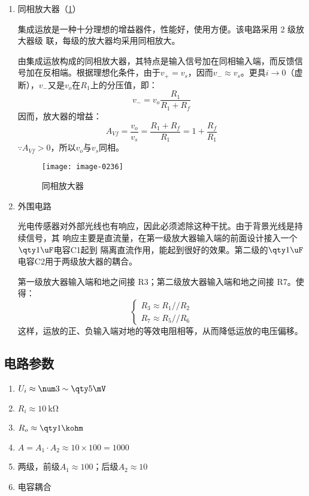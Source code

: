 \begin{enumerate}
  \item 同相放大器\cite{cn10}（\cref{4-3}）
  
  集成运放是一种十分理想的增益器件，性能好，使用方便。该电路采用 2 级放大器级
  联，每级的放大器均采用同相放大。

  由集成运放构成的同相放大器，其特点是输入信号加在同相输入端，而反馈信号加在反相端。根据理想化条件，由于$v_+=v_s$，因而$v_-\approx v_s$。更具$i\to0$（虚断），$v_-$又是$v_o$在$R_1$上的分压值，即：
  \begin{equation}
    v_-=v_o\frac{R_1}{R_1+R_f}
  \end{equation}
  因而，放大器的增益：
  \begin{equation}
    A_{Vf}=\frac{v_o}{v_s}=\frac{R_1+R_f}{R_1}=1+\frac{R_f}{R_1}
  \end{equation}
  $\because A_{Vf}>0$，所以$v_o$与$v_s$同相。
  
  \begin{figure}[htbp]
    \centering
    \texttt{[image: image-0236]}
    \caption{同相放大器}
    \label{4-3}
  \end{figure}
  \item 外围电路
  
  光电传感器对外部光线也有响应，因此必须滤除这种干扰。由于背景光线是持续信号，其
  响应主要是直流量，在第一级放大器输入端的前面设计接入一个$\qty1\uF$电容C1起到
  隔离直流作用，能起到很好的效果。第二级的$\qty1\uF$电容C2用于两级放大器的耦合。

  第一级放大器输入端和地之间接 R3；第二级放大器输入端和地之间接 R7。使得：
  \begin{equation}
    \begin{cases}
      R_3\approx R_1//R_2\\
      R_7\approx R_5//R_6
    \end{cases}
  \end{equation}
  这样，运放的正、负输入端对地的等效电阻相等，从而降低运放的电压偏移。
\end{enumerate}

\subsection{电路参数}

\begin{enumerate}
  \item {} $U_i\approx\num3\sim\qty5\mV$
  \item {} $R_i\approx\qty{10}\kohm$
  \item {} $R_o\approx\qty1\kohm$
  \item {} $A=A_1\cdot A_2\approx10\times100=1000$
  \item {} 两级，前级$A_1\approx100$；后级$A_2\approx10$
  \item {} 电容耦合
\end{enumerate}

